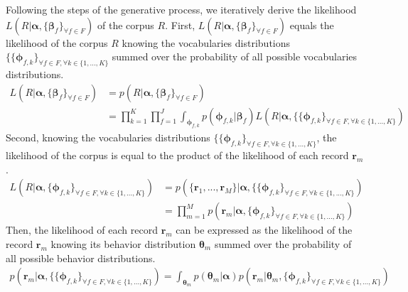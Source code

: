 Following the steps of the generative process, we iteratively derive the likelihood $L(R|\boldsymbol{\alpha}, \{\boldsymbol{\beta }_{f}\}_{\forall f\in F})$ of the corpus $R$. First, $L(R|\boldsymbol{\alpha},\{\boldsymbol{\beta }_{f}\}_{\forall f\in F})$ equals the likelihood of the corpus $R$ knowing the vocabularies distributions $\{\{\boldsymbol{\phi }_{f,k}\}_{\forall f \in F, \forall k\in\{1,...,K\}}$ summed over the probability of all possible vocabularies distributions.
\begin{equation} \label{eqghcmmdtlik}
\begin{aligned} 
L(R|\boldsymbol{\alpha}, \{\boldsymbol{\beta }_{f}\}_{\forall f\in F})&=p(R|\boldsymbol{\alpha},\{\boldsymbol{\beta }_{f}\}_{\forall f\in F})\\
&=\prod_{k=1}^{K}\prod_{f=1}^{J}\int_{\boldsymbol{\phi}_{f,k}}p(\boldsymbol{\phi }_{f,k}|\boldsymbol{\beta }_{f})L(R|\boldsymbol{\alpha}, \{\{\boldsymbol{\phi }_{f,k}\}_{\forall f \in F, \forall k\in\{1,...,K\}})
\end{aligned} 
\end{equation}
Second, knowing the vocabularies distributions $\{\{\boldsymbol{\phi }_{f,k}\}_{\forall f \in F, \forall k\in\{1,...,K\}}$, the likelihood of the corpus is equal to the product of the likelihood of each record $\mathbf{r}_{m}$.
\begin{equation}
\begin{aligned} 
L(R|\boldsymbol{\alpha}, \{\boldsymbol{\phi }_{f,k}\}_{\forall f \in F, \forall k\in\{1,...,K\}})&=p(\{\mathbf{r}_{1},...,\mathbf{r}_{M}\}|\boldsymbol{\alpha}, \{\{\boldsymbol{\phi }_{f,k}\}_{\forall f \in F, \forall k\in\{1,...,K\}})\\
&=\prod_{m=1}^{M}p(\mathbf{r}_{m}|\boldsymbol{\alpha}, \{\boldsymbol{\phi}_{f,k}\}_{\forall f \in F, \forall k\in\{1,...,K\}})
\end{aligned} 
\end{equation}
Then, the likelihood of each record $\mathbf{r}_{m}$ can be expressed as the likelihood of the record $\mathbf{r}_{m}$ knowing its behavior distribution $\boldsymbol{\theta}_{m}$ summed over the probability of all possible behavior distributions.
\begin{equation}
\begin{split} 
p(\mathbf{r}_{m}|\boldsymbol{\alpha}, \{\{\boldsymbol{\phi }_{f,k}\}_{\forall f \in F, \forall k\in\{1,...,K\}})=\int_{\boldsymbol{\theta}_{m} }p(\boldsymbol{\theta}_{m}|\boldsymbol{\alpha })p(\mathbf{r}_{m}|\boldsymbol{\theta }_{m}, \{\boldsymbol{\phi}_{f,k}\}_{\forall f \in F, \forall k\in\{1,...,K\}})
\end{split} 
\end{equation}
